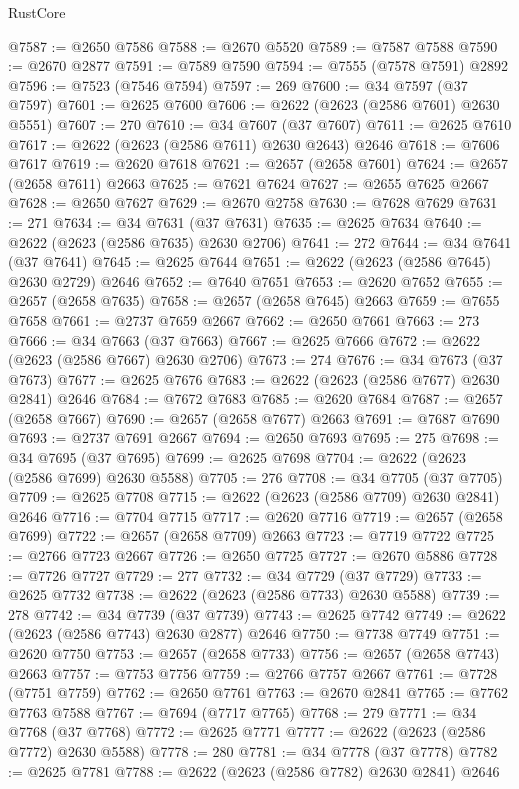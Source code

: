 \begin{lexlean}{RustCore}
\begin{coremodule}
@7587 := @2650 @7586
@7588 := @2670 @5520
@7589 := @7587 @7588
@7590 := @2670 @2877
@7591 := @7589 @7590
@7594 := @7555 (@7578 @7591) @2892
@7596 := @7523 (@7546 @7594)
@7597 := 269
@7600 := @34 @7597 (@37 @7597)
@7601 := @2625 @7600
@7606 := @2622 (@2623 (@2586 @7601) @2630 @5551)
@7607 := 270
@7610 := @34 @7607 (@37 @7607)
@7611 := @2625 @7610
@7617 := @2622 (@2623 (@2586 @7611) @2630 @2643) @2646
@7618 := @7606 @7617
@7619 := @2620 @7618
@7621 := @2657 (@2658 @7601)
@7624 := @2657 (@2658 @7611) @2663
@7625 := @7621 @7624
@7627 := @2655 @7625 @2667
@7628 := @2650 @7627
@7629 := @2670 @2758
@7630 := @7628 @7629
@7631 := 271
@7634 := @34 @7631 (@37 @7631)
@7635 := @2625 @7634
@7640 := @2622 (@2623 (@2586 @7635) @2630 @2706)
@7641 := 272
@7644 := @34 @7641 (@37 @7641)
@7645 := @2625 @7644
@7651 := @2622 (@2623 (@2586 @7645) @2630 @2729) @2646
@7652 := @7640 @7651
@7653 := @2620 @7652
@7655 := @2657 (@2658 @7635)
@7658 := @2657 (@2658 @7645) @2663
@7659 := @7655 @7658
@7661 := @2737 @7659 @2667
@7662 := @2650 @7661
@7663 := 273
@7666 := @34 @7663 (@37 @7663)
@7667 := @2625 @7666
@7672 := @2622 (@2623 (@2586 @7667) @2630 @2706)
@7673 := 274
@7676 := @34 @7673 (@37 @7673)
@7677 := @2625 @7676
@7683 := @2622 (@2623 (@2586 @7677) @2630 @2841) @2646
@7684 := @7672 @7683
@7685 := @2620 @7684
@7687 := @2657 (@2658 @7667)
@7690 := @2657 (@2658 @7677) @2663
@7691 := @7687 @7690
@7693 := @2737 @7691 @2667
@7694 := @2650 @7693
@7695 := 275
@7698 := @34 @7695 (@37 @7695)
@7699 := @2625 @7698
@7704 := @2622 (@2623 (@2586 @7699) @2630 @5588)
@7705 := 276
@7708 := @34 @7705 (@37 @7705)
@7709 := @2625 @7708
@7715 := @2622 (@2623 (@2586 @7709) @2630 @2841) @2646
@7716 := @7704 @7715
@7717 := @2620 @7716
@7719 := @2657 (@2658 @7699)
@7722 := @2657 (@2658 @7709) @2663
@7723 := @7719 @7722
@7725 := @2766 @7723 @2667
@7726 := @2650 @7725
@7727 := @2670 @5886
@7728 := @7726 @7727
@7729 := 277
@7732 := @34 @7729 (@37 @7729)
@7733 := @2625 @7732
@7738 := @2622 (@2623 (@2586 @7733) @2630 @5588)
@7739 := 278
@7742 := @34 @7739 (@37 @7739)
@7743 := @2625 @7742
@7749 := @2622 (@2623 (@2586 @7743) @2630 @2877) @2646
@7750 := @7738 @7749
@7751 := @2620 @7750
@7753 := @2657 (@2658 @7733)
@7756 := @2657 (@2658 @7743) @2663
@7757 := @7753 @7756
@7759 := @2766 @7757 @2667
@7761 := @7728 (@7751 @7759)
@7762 := @2650 @7761
@7763 := @2670 @2841
@7765 := @7762 @7763 @7588
@7767 := @7694 (@7717 @7765)
@7768 := 279
@7771 := @34 @7768 (@37 @7768)
@7772 := @2625 @7771
@7777 := @2622 (@2623 (@2586 @7772) @2630 @5588)
@7778 := 280
@7781 := @34 @7778 (@37 @7778)
@7782 := @2625 @7781
@7788 := @2622 (@2623 (@2586 @7782) @2630 @2841) @2646

\end{coremodule}
\end{lexlean}

